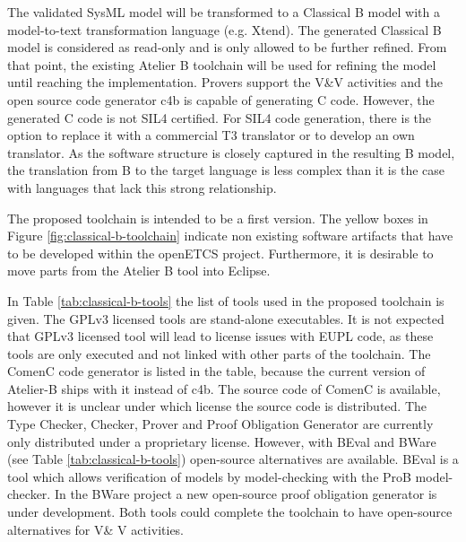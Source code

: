 The validated SysML model will be transformed to a Classical B model
with a model-to-text transformation language (e.g. Xtend). The
generated Classical B model is considered as read-only and is only
allowed to be further refined. From that point, the existing Atelier B
toolchain will be used for refining the model until reaching the
implementation. Provers support the V\&V activities and the open
source code generator c4b is capable of generating C code. However,
the generated C code is not SIL4 certified. For SIL4 code generation,
there is the option to replace it with a commercial T3 translator or
to develop an own translator. As the software structure is closely
captured in the resulting B model, the translation from B to the
target language is less complex than it is the case with languages
that lack this strong relationship.

The proposed toolchain is intended to be a first version. The yellow
boxes in Figure \ref{fig:classical-b-toolchain} indicate non existing
software artifacts that have to be developed within the openETCS
project. Furthermore, it is desirable to move parts from the Atelier B
tool into Eclipse. 

In Table \ref{tab:classical-b-tools} the list of tools used in the
proposed toolchain is given. The GPLv3 licensed tools are stand-alone
executables. It is not expected that GPLv3 licensed tool will lead to
license issues with EUPL code, as these tools are only executed and
not linked with other parts of the toolchain. The ComenC code
generator is listed in the table, because the current version of
Atelier-B ships with it instead of c4b. The source code of ComenC is
available, however it is unclear under which license the source code
is distributed. The Type Checker, Checker, Prover and Proof Obligation
Generator are currently only distributed under a proprietary
license. However, with BEval and BWare (see Table
\ref{tab:classical-b-tools}) open-source alternatives are
available. BEval is a tool which allows verification of models by
model-checking with the ProB model-checker. In the BWare project a new
open-source proof obligation generator is under development. Both
tools could complete the toolchain to have open-source alternatives
for V\& V activities.

